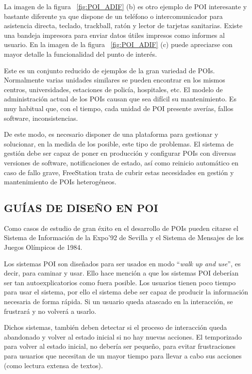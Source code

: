 La imagen de la figura ~\ref{fig:POI_ADIF} (b) es otro ejemplo de POI
interesante y bastante diferente ya que dispone de un teléfono o intercomunicador para 
asistencia directa, teclado, trackball, ratón y lector
de tarjetas sanitarias. Existe una bandeja impresora para enviar datos
útiles impresos como informes al usuario. En la imagen de la figura
~\ref{fig:POI_ADIF} (c) puede apreciarse con mayor detalle la funcionalidad del
punto de interés.

Este es un conjunto reducido de ejemplos de la gran variedad de POIs.
Normalmente varias unidades similares se pueden encontrar en los mismos centros,
universidades, estaciones de policía, hospitales, etc. El modelo de
administración actual de los POIs causan que sea difícil su mantenimiento. Es
muy habitual que, con el tiempo, cada unidad de POI presente averías, fallos
software, inconsistencias.

De este modo, es necesario disponer de una plataforma para gestionar y
solucionar, en la medida de los posible, este tipo de problemas. El sistema de
gestión debe ser capaz de poner en producción y configurar POIs con diversas
versiones de software, notificaciones de estado, así como reinicio automático en
caso de fallo grave, FreeStation trata de cubrir estas necesidades en gestión y
mantenimiento de POIs heterogéneos.

\subsection{\uppercase{Guías de diseño en POI}}
\label{sec:guiadesignpoi}

Como casos de estudio de gran éxito en el desarrollo de POIs pueden citarse el
Sistema de Información de la Expo'92 de Sevilla\cite{Mag07} y el Sistema de
Mensajes de los Juegos Olímpicos de 1984\cite{GoB87}.

Los sistemas POI son diseñados para ser usados en
modo ``\emph{walk up and use}'', es decir, para caminar y usar. Ello hace
mención a que los sistemas POI deberían ser tan autoexplicatorios como fuera 
posible. Los usuarios tienen poco tiempo para usar el sistema, por ello el
sistema debe ser capaz de producir la información necesaria de forma rápida. Si un usuario
queda atascado en la interacción, se frustrará y no volverá a usarlo.

Dichos sistemas, también deben detectar si el proceso de interacción queda
abandonado y volver al estado inicial si no hay nuevas acciones. El
temporizado para volver al estado inicial, no debería ser pequeño, para evitar
frustraciones para usuarios que necesitan de un mayor tiempo para llevar a cabo
sus acciones (como lectura extensa de textos).

